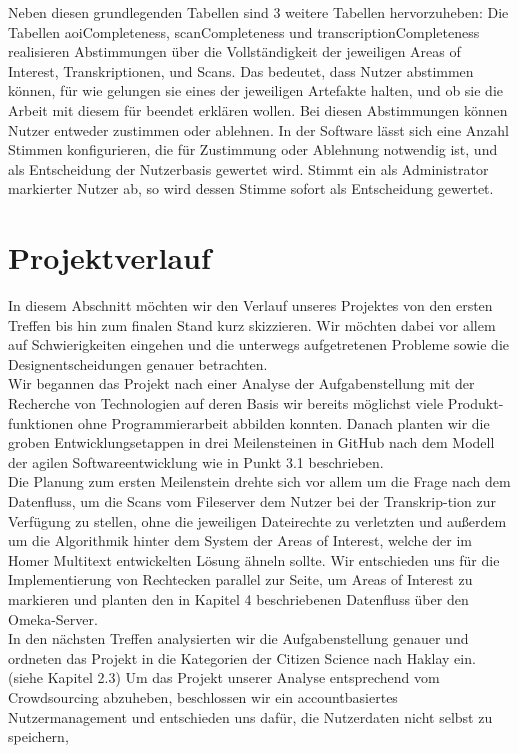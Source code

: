 \documentclass{article}
\begin{document}
Neben diesen grundlegenden Tabellen sind 3 weitere Tabellen hervorzuheben:
Die Tabellen aoiCompleteness, scanCompleteness und transcriptionCompleteness
realisieren Abstimmungen über die Vollständigkeit der jeweiligen Areas of Interest, Transkriptionen, und Scans.
Das bedeutet, dass Nutzer abstimmen können,
für wie gelungen sie eines der jeweiligen Artefakte halten,
und ob sie die Arbeit mit diesem für beendet erklären wollen.
Bei diesen Abstimmungen können Nutzer entweder zustimmen oder ablehnen.
In der Software lässt sich eine Anzahl Stimmen konfigurieren,
die für Zustimmung oder Ablehnung notwendig ist,
und als Entscheidung der Nutzerbasis gewertet wird.
Stimmt ein als Administrator markierter Nutzer ab,
so wird dessen Stimme sofort als Entscheidung gewertet.

\section{Projektverlauf}
In diesem Abschnitt möchten wir den Verlauf unseres Projektes von den ersten Treffen bis hin zum finalen Stand kurz skizzieren.
Wir möchten dabei vor allem auf Schwierigkeiten eingehen und die unterwegs aufgetretenen Probleme sowie die Designentscheidungen genauer betrachten. \\
Wir begannen das Projekt nach einer Analyse der Aufgabenstellung mit der Recherche von Technologien auf deren Basis wir bereits möglichst viele Produkt-funktionen ohne Programmierarbeit abbilden konnten.
Danach planten wir die groben Entwicklungsetappen in drei Meilensteinen in GitHub nach dem Modell der agilen Softwareentwicklung wie in Punkt 3.1 beschrieben.\\
Die Planung zum ersten Meilenstein drehte sich vor allem um die Frage nach dem Datenfluss, um die Scans vom Fileserver dem Nutzer bei der Transkrip-tion zur Verfügung zu stellen, 
ohne die jeweiligen Dateirechte zu verletzten und außerdem um die Algorithmik hinter dem System der Areas of Interest, welche der im Homer Multitext entwickelten Lösung ähneln sollte. 
Wir entschieden uns für die Implementierung von Rechtecken parallel zur Seite, 
um Areas of Interest zu markieren und planten den in Kapitel 4 beschriebenen Datenfluss über den Omeka-Server.\\
In den nächsten Treffen analysierten wir die Aufgabenstellung genauer und ordneten das Projekt in die Kategorien der Citizen Science nach Haklay ein. (siehe Kapitel 2.3) 
Um das Projekt unserer Analyse entsprechend vom Crowdsourcing abzuheben, beschlossen wir ein accountbasiertes Nutzermanagement und entschieden uns dafür, die Nutzerdaten nicht selbst zu speichern,
\end{document}
